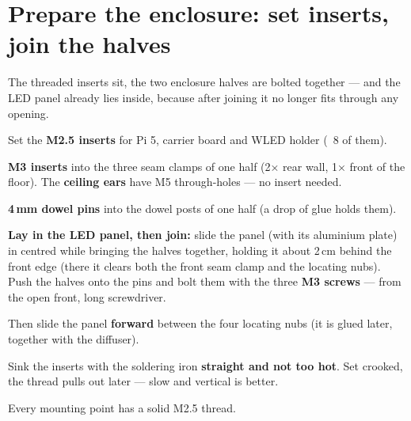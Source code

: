 \section{Prepare the enclosure: set inserts, join the halves}
\begin{ziel}
The threaded inserts sit, the two enclosure halves are bolted together — and the LED panel
already lies inside, because after joining it no longer fits through any opening.
\end{ziel}
\begin{schritte}
  \item Set the \textbf{M2.5 inserts} for Pi 5, carrier board and WLED holder (~8 of them).
  \item \textbf{M3 inserts} into the three seam clamps of one half (2× rear wall, 1× front
        of the floor). The \textbf{ceiling ears} have M5 through-holes — no insert needed.
  \item \textbf{4\,mm dowel pins} into the dowel posts of one half (a drop of glue holds them).
  \item \textbf{Lay in the LED panel, then join:} slide the panel (with its aluminium
        plate) in centred while bringing the halves together, holding it about 2\,cm
        behind the front edge (there it clears both the front seam clamp and the locating
        nubs). Push the halves onto the pins and bolt them with the three \textbf{M3
        screws} — from the open front, long screwdriver.
  \item Then slide the panel \textbf{forward} between the four locating nubs (it is glued
        later, together with the diffuser).
\end{schritte}
\begin{achtung}
Sink the inserts with the soldering iron \textbf{straight and not too hot}. Set crooked,
the thread pulls out later — slow and vertical is better.
\end{achtung}
\begin{ergebnis}
Every mounting point has a solid M2.5 thread.
\end{ergebnis}

\clearpage
